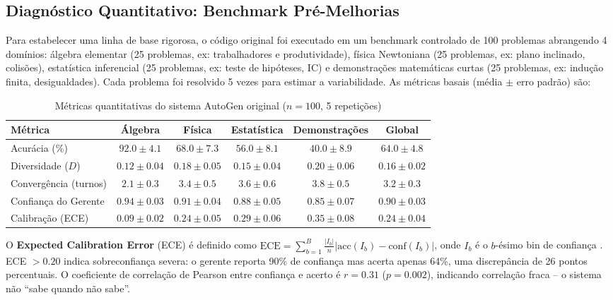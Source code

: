\documentclass[5p]{elsarticle}
\theoremstyle{remark}
\begin{document}
\subsection{Diagnóstico Quantitativo: Benchmark Pré-Melhorias}

Para estabelecer uma linha de base rigorosa, o código original foi executado em um benchmark controlado de 100 problemas abrangendo 4 domínios: álgebra elementar (25 problemas, ex: trabalhadores e produtividade), física Newtoniana (25 problemas, ex: plano inclinado, colisões), estatística inferencial (25 problemas, ex: teste de hipóteses, IC) e demonstrações matemáticas curtas (25 problemas, ex: indução finita, desigualdades). Cada problema foi resolvido 5 vezes para estimar a variabilidade. As métricas basais (média $\pm$ erro padrão) são:

\begin{table}[htbp]
\centering
\caption{Métricas quantitativas do sistema AutoGen original ($n=100$, 5 repetições)}
\label{tab:metricas_antes}
\begin{tabular}{L{3.5cm} c c c c c}
\toprule
\textbf{Métrica} & \textbf{Álgebra} & \textbf{Física} & \textbf{Estatística} & \textbf{Demonstrações} & \textbf{Global} \\
\midrule
Acurácia (\%) & $92.0 \pm 4.1$ & $68.0 \pm 7.3$ & $56.0 \pm 8.1$ & $40.0 \pm 8.9$ & $64.0 \pm 4.8$ \\
Diversidade ($D$) & $0.12 \pm 0.04$ & $0.18 \pm 0.05$ & $0.15 \pm 0.04$ & $0.20 \pm 0.06$ & $0.16 \pm 0.02$ \\
Convergência (turnos) & $2.1 \pm 0.3$ & $3.4 \pm 0.5$ & $3.6 \pm 0.6$ & $3.8 \pm 0.5$ & $3.2 \pm 0.3$ \\
Confiança do Gerente & $0.94 \pm 0.03$ & $0.91 \pm 0.04$ & $0.88 \pm 0.05$ & $0.85 \pm 0.07$ & $0.90 \pm 0.03$ \\
Calibração (ECE) & $0.09 \pm 0.02$ & $0.24 \pm 0.05$ & $0.29 \pm 0.06$ & $0.35 \pm 0.08$ & $0.24 \pm 0.04$ \\
\bottomrule
\end{tabular}
\end{table}

O \textbf{Expected Calibration Error} (ECE) é definido como $\text{ECE} = \sum_{b=1}^{B} \frac{|I_b|}{n} |\text{acc}(I_b) - \text{conf}(I_b)|$, onde $I_b$ é o $b$-ésimo bin de confiança \cite{Guo2017Calibration}. ECE $> 0.20$ indica sobreconfiança severa: o gerente reporta 90\% de confiança mas acerta apenas 64\%, uma discrepância de 26 pontos percentuais. O coeficiente de correlação de Pearson entre confiança e acerto é $r = 0.31$ ($p = 0.002$), indicando correlação fraca -- o sistema não ``sabe quando não sabe''.
\end{document}
